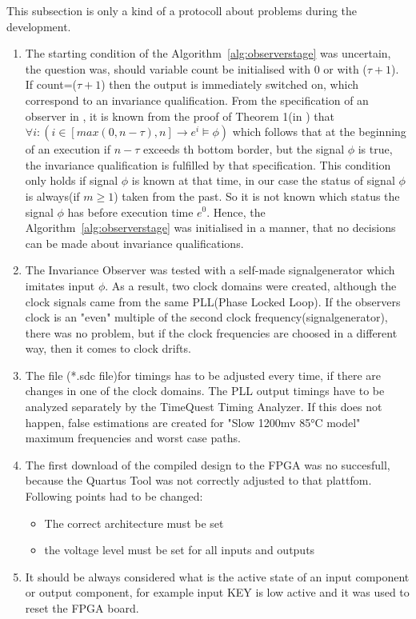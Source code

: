 This subsection is only a kind of a protocoll about problems during the development. 
\begin{enumerate}
\item The starting condition of the Algorithm~\ref{alg:observerstage} was uncertain, the question was, should variable
count be initialised with 0 or with ($\tau + 1$). If count=($\tau + 1$) then the output is immediately switched on, which
correspond to an invariance qualification. From the specification of an observer in \cite{RTFMBJ13}, it is known from
the proof of Theorem 1(in \cite{RTFMBJ13}) that $\forall i:(i \in [max(0,n-\tau),n] \rightarrow e^i \models \phi)$ which follows 
that at the beginning of an execution if $n-\tau$ exceeds th bottom border, but the signal $\phi$ is true, the invariance qualification
is fulfilled by that specification. 
This condition only holds if signal $\phi$ is known at that time, in our case the status of signal $\phi$ is always(if $m \ge 1$) taken from the past. 
So it is not known which status the signal $\phi$ has before execution time $e^0$. Hence, the Algorithm~\ref{alg:observerstage} was initialised in a manner, that
no decisions can be made about invariance qualifications. 
\item The Invariance Observer was tested with a  self-made signalgenerator which imitates input $\phi$. As a result, two clock domains were created, although the clock signals
came from the same PLL(Phase Locked Loop). If the observers clock is an "even" multiple of the second clock frequency(signalgenerator), there was no problem, but if the clock frequencies are choosed in a different way, then
it comes to clock drifts. 
\item The file (*.sdc file)for timings has to be adjusted every time, if there are changes in one of the clock domains. The PLL output timings have to be analyzed separately by the
TimeQuest Timing Analyzer. If this does not happen, false estimations are created for "Slow 1200mv 85°C model" maximum frequencies and worst case paths. 
\item The first download of the compiled design to the FPGA was no succesfull, because the Quartus Tool was not correctly adjusted to that plattfom. 
Following points had to be changed:
\begin{itemize}
\item The correct architecture must be set
\item the voltage level must be set for all inputs and outputs
\end{itemize}
\item It should be always considered what is the active state of an input component or output component, for example
input KEY is low active and it was used to reset the FPGA board. 
\end{enumerate}
